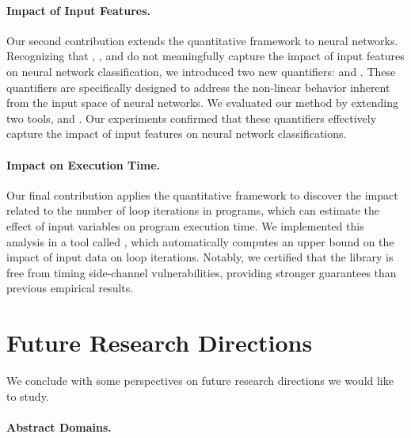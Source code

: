 \paragraph{Impact of Input Features.} Our second contribution extends the quantitative framework to neural networks.
Recognizing that \outcomesname{}, \rangename{}, and \qusedname{} do not meaningfully capture the impact of input features on neural network classification, we introduced two new quantifiers: \changesname{} and \qlibraname{}. These quantifiers are specifically designed to address the non-linear behavior inherent from the input space of neural networks.
We evaluated our method by extending two tools, \impatto{} and \libra{}\sidenote{\libraurl}.
Our experiments confirmed that these quantifiers effectively capture the impact of input features on neural network classifications.


\paragraph{Impact on Execution Time.} Our final contribution applies the quantitative framework to discover the impact related to the number of loop iterations in programs, which can estimate the effect of input variables on program execution time. We implemented this analysis in a tool called \timesec\sidenote{\timesecurl}, which automatically computes an upper bound on the impact of input data on loop iterations. Notably, we certified that the \bignum{} library\sidenote{\bignumurl} is free from timing side-channel vulnerabilities, providing stronger guarantees than previous empirical results.


\section*{Future Research Directions}

We conclude with some perspectives on future research directions we would like to study.

\paragraph{Abstract Domains.}

